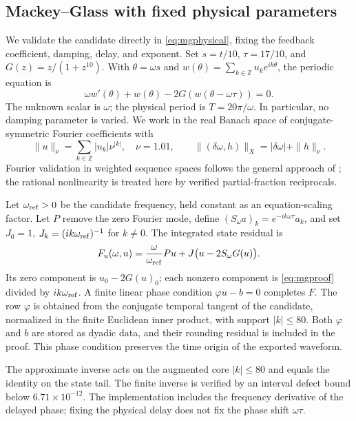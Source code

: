 \documentclass[11pt]{article}
\begin{document}
\subsection{Mackey--Glass with fixed physical parameters}
\label{sec:mgcap}
We validate the candidate directly in \eqref{eq:mgphysical}, fixing the feedback coefficient, damping, delay, and exponent. Set $s=t/10$, $\tau=17/10$, and $G(z)=z/(1+z^{10})$. With $\theta=\omega s$ and $w(\theta)=\sum_{k\in\mathbb Z}u_ke^{ik\theta}$, the periodic equation is
\begin{equation}
 \omega w'(\theta)+w(\theta)-2G(w(\theta-\omega\tau))=0.
 \label{eq:mgproof}
\end{equation}
The unknown scalar is $\omega$; the physical period is $T=20\pi/\omega$. In particular, no damping parameter is varied. We work in the real Banach space of conjugate-symmetric Fourier coefficients with
\begin{equation}
 \|u\|_\nu=\sum_{k\in\mathbb Z}|u_k|\nu^{|k|},\quad
 \nu=1.01,\qquad
 \|(\delta\omega,h)\|_X=|\delta\omega|+\|h\|_\nu.
 \label{eq:mgnorm}
\end{equation}
Fourier validation in weighted sequence spaces follows the general approach of \citet{berg2022}; the rational nonlinearity is treated here by verified partial-fraction reciprocals.

Let $\omega_{\rm ref}>0$ be the candidate frequency, held constant as an equation-scaling factor. Let $P$ remove the zero Fourier mode, define $(S_\omega a)_k=e^{-ik\omega\tau}a_k$, and set $J_0=1$, $J_k=(ik\omega_{\rm ref})^{-1}$ for $k\neq0$. The integrated state residual is
\begin{equation}
 F_u(\omega,u)=\frac{\omega}{\omega_{\rm ref}}Pu
                  +J\bigl(u-2S_\omega G(u)\bigr).
 \label{eq:mgfixedoperator}
\end{equation}
Its zero component is $u_0-2G(u)_0$; each nonzero component is \eqref{eq:mgproof} divided by $ik\omega_{\rm ref}$. A finite linear phase condition $\varphi u-b=0$ completes $F$. The row $\varphi$ is obtained from the conjugate temporal tangent of the candidate, normalized in the finite Euclidean inner product, with support $|k|\leq80$. Both $\varphi$ and $b$ are stored as dyadic data, and their rounding residual is included in the proof. This phase condition preserves the time origin of the exported waveform.

The approximate inverse acts on the augmented core $|k|\leq80$ and equals
the identity on the state tail. The finite inverse is verified by an interval
defect bound below $6.71\times10^{-12}$. The implementation includes the
frequency derivative of the delayed phase; fixing the physical delay does not
fix the phase shift $\omega\tau$.
\end{document}
